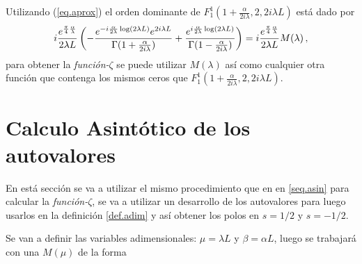 Utilizando (\ref{eq.aprox}) el orden dominante de $F _1 ^1 (1+  \frac{  \alpha}{2 i \lambda} ,2 ,2 i \lambda L  )$ está dado por
\begin{equation}
    i  \frac{e ^{ \frac{\pi}{4} \frac{\alpha}{\lambda} } }{2 \lambda L}
    \left( -
    \frac{e ^{- i \frac{\alpha}{2 \lambda}  \log (2 \lambda L) } e ^{2 i \lambda L} }{\Gamma(1+\frac{ \alpha}{2 i \lambda})} +
    \frac{e ^{  i \frac{\alpha}{2 \lambda}  \log (2 \lambda L) }}               {\Gamma(1-\frac{ \alpha}{2 i \lambda})}
    \right) \\[5pt]  
    =  i  \frac{e ^{ \frac{\pi}{4} \frac{\alpha}{\lambda} } }{2 \lambda L}     M (\lambda) 
    \, ,
\label{eq.completa}
\end{equation}
para obtener la {\it función-$\zeta $} se puede utilizar $M( \lambda)$ así  como cualquier otra función que contenga los mismos ceros que $F _1 ^1 (1+  \frac{  \alpha}{2 i \lambda} ,2 ,2 i \lambda L  )$.

\section{Calculo Asintótico de los autovalores}\label{seq.2.asin}


En está sección se va a utilizar el mismo procedimiento que en en \ref{seq.asin} para calcular la {\it función-$\zeta$}, se va a utilizar un desarrollo de los autovalores para luego usarlos en la definición \ref{def.adim} y así obtener los polos en $s=1/2$ y  $s=-1/2$.

Se van a definir las variables adimensionales: $\mu = \lambda L $ y $\beta = \alpha L$, luego se trabajará con una  $M (\mu)$ de la forma

